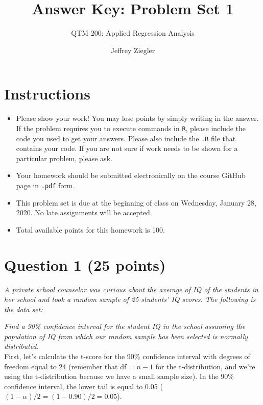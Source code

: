 \documentclass[12pt,letterpaper]{article}
\title{Answer Key: Problem Set 1}
\date{Jeffrey Ziegler}
\author{QTM 200: Applied Regression Analysis}
\begin{document}
	\maketitle
	
	\section*{Instructions}
	\begin{itemize}
		\item Please show your work! You may lose points by simply writing in the answer. If the problem requires you to execute commands in \texttt{R}, please include the code you used to get your answers. Please also include the \texttt{.R} file that contains your code. If you are not sure if work needs to be shown for a particular problem, please ask.
		\item Your homework should be submitted electronically on the course GitHub page in \texttt{.pdf} form.
		\item This problem set is due at the beginning of class on Wednesday, January 28, 2020. No late assignments will be accepted.
		\item Total available points for this homework is 100.
	\end{itemize}
	
	\vspace{1cm}
	\section*{Question 1 (25 points)}

\emph{A private school counselor was curious about the average of IQ of the students in her school and took a random sample of 25 students' IQ scores. The following is the data set:}

\vspace{.5cm}

\noindent \emph{Find a 90\% confidence interval for the student IQ in the school assuming the population of IQ from which our random sample has been selected is normally distributed. }\\

\vspace{.15cm}
\noindent First, let's calculate the t-score for the 90\% confidence interval with degrees of freedom equal to 24 (remember that df = $n-1$ for the t-distribution, and we're using the t-distribution because we have a small sample size). In the 90\% confidence interval, the lower tail is equal to 0.05 ($(1-\alpha)/2 = (1-0.90)/2 = 0.05$).\\
\end{document}
